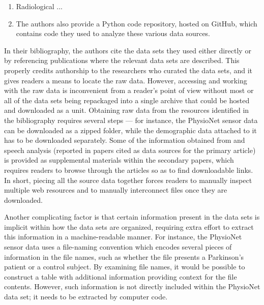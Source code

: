 \documentclass[11pt,letterpaper]{article}
\newcommand{\MRI}{\resizebox{!}{7pt}{\AcronymText{MRI}}}
\newcommand{\textscc}[1]{{\color{orr!35!black}{{%
						\fontfamily{Cabin-TLF}\fontseries{b}\selectfont{\textsc{\scriptsize{#1}}}}}}}
\newcommand{\AcronymText}[1]{{\textscc{#1}}}
\newcommand{\p}[1]{

\vspace{.7em}#1}
\begin{document}
{{\begin{enumerate}
\item{}  Radiological ...

\item{}  The authors also provide a Python code repository, hosted on GitHub, which contains code they used to analyze these various data sources.
    
\end{enumerate}
} 
  
\p{In their bibliography, the authors cite the data sets they used either directly or by 
referencing publications where the relevant data sets are described.  This properly 
credits authorship to the researchers who curated the data sets, and it gives readers a 
means to locate the raw data.  However, accessing and working with the raw data is 
inconvenient from a reader's point of view without most or all of the data sets being 
repackaged into a single archive that could be hosted and downloaded as a unit.  
Obtaining raw data from the resources identified in the bibliography requires 
several steps --- for instance, the PhysioNet sensor data can be downloaded 
as a zipped folder, while the demographic data attached to it has to be downloaded 
separately.  Some of the information obtained from \MRI{} and speech analysis 
(reported in papers cited as data sources for the primary article) is provided 
as supplemental materials within the secondary papers, which requires readers 
to browse through the articles so as to find downloadable links.  In short, piecing all 
the source data together forces readers to manually inspect multiple web resources 
and to manually interconnect files once they are downloaded.}

\p{Another complicating factor is that certain information present in the data sets 
is implicit within how the data sets are organized, requiring extra effort to 
extract this information in a machine-readable manner.  For instance, the PhysioNet 
sensor data uses a file-naming convention which encodes several pieces of 
information in the file names, such as whether the file presents a Parkinson's patient 
or a control subject.  By examining file names, it would be possible to construct a 
table with additional information providing context for the file contents.  However, 
such information is not directly included within the PhysioNet data set; it 
needs to be extracted by computer code.}

}
\end{document}
